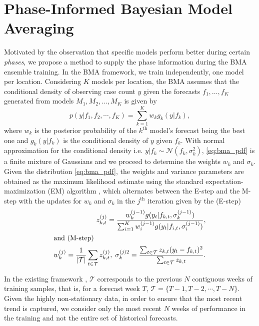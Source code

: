 \documentclass[conference,compsoc]{IEEEtran}
\begin{document}
\section{Phase-Informed Bayesian Model Averaging}\label{sec:PIBMA}
Motivated by the observation that specific models perform better during certain \emph{phases}, we propose a method to supply the phase information during the BMA ensemble training. In the BMA framework, we train independently, one model per location. Considering $K$ models per location, the BMA assumes that the conditional density of observing case count $y$ given the forecasts $f_1, \dots, f_K$ generated from  models $M_1, M_2, \dots, M_K$ is given by 
\begin{equation}
    p(y| f_1, f_2, \cdots, f_K) = \sum_{k=1}^{K} w_k g_k (y|f_k),
    \label{eq:bma_pdf}
\end{equation}
where $w_k$ is the posterior probability of the $k^{\mathrm{th}}$ model's forecast being the best one and $g_k(y|f_k)$ is the conditional density of $y$ given $f_k$. With normal approximation for the conditional density i.e. $y|f_k \sim \mathcal{N}(f_k,\sigma^2_k)$, \eqref{eq:bma_pdf} is a finite mixture of Gaussians and we proceed to determine the weights $w_k$ and $\sigma_k$. Given the distribution \eqref{eq:bma_pdf}, the weights and variance parameters are obtained as the maximum likelihood estimate using the standard expectation-maximization (EM) algorithm \cite{raftery2005using}, which
alternates between the E-step and the M-step with the updates for $w_k$ and $\sigma_k$ in the $j^{\text{th}}$ iteration given by the (E-step)
\begin{align}
    \quad z^{(j)}_{k,t} = \frac{w^{(j-1)}_kg({y_t|f_{k,t}, \sigma_k^{(j-1)}})}{\sum_{i=1}^K w^{(j-1)}_i g(y_t|f_{i,t}, \sigma_i^{(j-1)})}, \nonumber\\ \intertext{and (M-step)}
     w^{(j)}_k = \frac{1}{|\mathcal{T}|} \sum_{t \in \mathcal{T}} z_{k,t}^{(j)}, \; \sigma^{(j)2}_k = \frac{\sum_{t \in \mathcal{T}}z_{k,t}(y_t-f_{k,t})^2}{\sum_{t \in \mathcal{T}}z_{k,t}  }.
    \label{eq:bma_fixed}
\end{align}

 In the existing framework \cite{allmodels}, $\mathcal{T}$ corresponds to the previous $N$ contiguous weeks of training samples, that is, for a forecast week $T$, $\mathcal{T}=\{T-1, T-2, \cdots, T-N\}$. Given the highly non-stationary data, in order to ensure that the most recent trend is captured, we consider only the most recent $N$ weeks of performance in the training and not the entire set of historical forecasts. 
\end{document}
